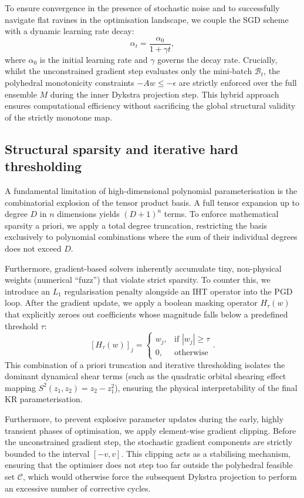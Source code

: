 To ensure convergence in the presence of stochastic noise and to successfully navigate flat ravines in the optimisation landscape, we couple the SGD scheme with a dynamic learning rate decay:
$$\alpha_t = \frac{\alpha_0}{1 + \gamma t},$$
where $\alpha_0$ is the initial learning rate and $\gamma$ governs the decay rate. Crucially, whilst the unconstrained gradient step evaluates only the mini-batch $\mathcal{B}_t$, the polyhedral monotonicity constraints $-Aw \le -\epsilon$ are strictly enforced over the full ensemble $M$ during the inner Dykstra projection step. This hybrid approach ensures computational efficiency without sacrificing the global structural validity of the strictly monotone map.

\subsection{Structural sparsity and iterative hard thresholding}

A fundamental limitation of high-dimensional polynomial parameterisation is the combinatorial explosion of the tensor product basis. A full tensor expansion up to degree $D$ in $n$ dimensions yields $(D+1)^n$ terms. To enforce mathematical sparsity a priori, we apply a total degree truncation, restricting the basis exclusively to polynomial combinations where the sum of their individual degrees does not exceed $D$.

Furthermore, gradient-based solvers inherently accumulate tiny, non-physical weights (numerical ``fuzz'') that violate strict sparsity. To counter this, we introduce an $L_1$ regularisation penalty alongside an IHT operator into the PGD loop. After the gradient update, we apply a boolean masking operator $H_\tau(w)$ that explicitly zeroes out coefficients whose magnitude falls below a predefined threshold $\tau$:
$$[H_\tau(w)]_j = \begin{cases} w_j, & \text{if } |w_j| \ge \tau \\ 0, & \text{otherwise} \end{cases}.$$
This combination of a priori truncation and iterative thresholding isolates the dominant dynamical shear terms (such as the quadratic orbital shearing effect mapping $S^2(z_1, z_2) = z_2 - z_1^2$), ensuring the physical interpretability of the final KR parameterisation.

Furthermore, to prevent explosive parameter updates during the early, highly transient phases of optimisation, we apply element-wise gradient clipping. Before the unconstrained gradient step, the stochastic gradient components are strictly bounded to the interval $[-v, v]$. This clipping acts as a stabilising mechanism, ensuring that the optimiser does not step too far outside the polyhedral feasible set $\mathcal{C}$, which would otherwise force the subsequent Dykstra projection to perform an excessive number of corrective cycles.